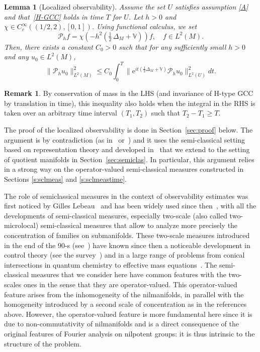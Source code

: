 \documentclass[JEP,XML,SOM,Unicode,published]{cedram}
\let\mathcal\mathscr
\newcommand{\rme}{\mathrm{e}}
\theoremstyle{plain}
\newtheorem{lemma}[theorem]{Lemma}
\theoremstyle{definition}
\newtheorem{remark}[theorem]{Remark}
\def\bbV{{\mathbb V}}
\begin{document}
\begin{lemma}[Localized observability]\label{lem:locobs}
Assume the set $U$ satisfies assumption \eqref{A} and that~\eqref{H-GCC} holds in time $T$ for $U$. Let $h>0$ and $\chi\in C_c^\infty((1/2,2),[0,1])$. Using functional calculus, we set
\begin{equation}\label{def:Pih}
\mathcal{P}_h f= \chi\left(-h^2\left(\tfrac12\, \Delta_M+\bbV\right)\right) f,\quad f\in L^2(M).
\end{equation}
Then, there exists a constant $C_0>0$ such that for any sufficiently small $h>0$ and any $u_0\in L^2(M)$,
\begin{equation}\label{obs_loc}
\| \mathcal{P}_h u_0\|^2_{L^2(M)} \leq C_0 \int_0^T \bigl\| \rme^{it(\frac12 \Delta_M+\bbV)} \mathcal{P}_h u_0\bigr\|^2_{L^2(U)} dt.
\end{equation}
\end{lemma}

\begin{remark} \label{r:masscons}
By conservation of mass in the LHS (and invariance of H-type GCC by translation in time), this inequality also holds when the integral in the RHS is taken over an arbitrary time interval $(T_1,T_2)$ such that $T_2-T_1\geq T$.
\end{remark}

The proof of the localized observability is done in Section~\ref{sec:proof} below.
The argument is by contradiction (as in~\cite{BZ} or~\cite[\S 7]{AM14}) and it
uses the semi-classical setting based on representation theory and developed in~\cite{FF1,FF} that we extend to the setting of quotient manifolds in Section~\ref{sec:semiclas}.
In particular, this argument relies in a strong way on the operator-valued semi-classical measures constructed in Sections \ref{s:sclmeas} and \ref{s:sclmeastime}.

The role of semiclassical measures in the context of observability estimates was first noticed by Gilles Lebeau~\cite{lebeau}
and has been
widely used since then~\cite{MaciaTorus,AM14,AFM15,MacRiv18}, with all the developments of semi-classical measures, especially two-scale (also called two-microlocal) semi-classical measures that allow to analyze more precisely the concentration of families on submanifolds. These two-scale measures introduced in the end of the 90-s (see~\cite{Fermanian_note1,Fermanian_Note2,FG02, NierScat, MillerThesis}) have known since then a noticeable development in control theory (see the survey~\cite{MaciaLille}) and in a large range of problems from conical intersections in quantum chemistry \cite{LT05, FL08} to effective mass equations~\cite{CFM19,CFM20}. The semi-classical measures that we consider here have common features with the two-scales ones in the sense that they are operator-valued. This operator-valued feature arises from the inhomogeneity of the nilmanifolds, in parallel with the homogeneity introduced by a second scale of concentration as in the references above. However, the operator-valued feature is more fundamental here since it is due to non-commutativity of nilmanifolds and is a direct consequence of the original features of Fourier analysis on nilpotent groups: it is thus intrinsic to the structure of the problem.
\end{document}
